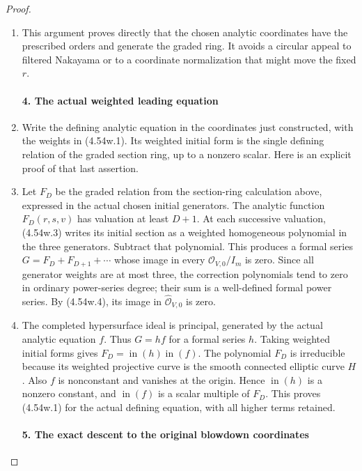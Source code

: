 \begin{proof}
\begin{enumerate}[label={$\langle1\rangle$\arabic*.},leftmargin=*]
\item This argument proves directly that the chosen analytic
coordinates have the prescribed orders and generate the
graded ring. It avoids a circular appeal to filtered
Nakayama or to a coordinate normalization that might move
the fixed \(r\).

\paragraph{4. The actual weighted leading equation}

\item Write the defining analytic equation in the coordinates just
constructed, with the weights in (4.54w.1). Its weighted initial
form is the single defining relation of the graded section
ring, up to a nonzero scalar. Here is an explicit proof of that
last assertion.

\item Let \(F_D\) be the graded relation from the section-ring calculation above, expressed
in the actual chosen initial generators. The analytic function
\(F_D(r,s,v)\) has valuation at least \(D+1\).
At each successive valuation, (4.54w.3) writes its initial
section as a weighted homogeneous polynomial in the three
generators. Subtract that polynomial. This produces a formal
series \(G=F_D+F_{D+1}+\cdots\) whose image in every
\(\mathcal O_{V,0}/I_m\) is zero. Since all generator
weights are at most three, the correction polynomials tend
to zero in ordinary power-series degree; their sum is a
well-defined formal power series. By (4.54w.4), its image in
\(\widehat{\mathcal O}_{V,0}\) is zero.

\item The completed hypersurface ideal is principal, generated by
the actual analytic equation \(f\). Thus \(G=h f\) for
a formal series \(h\). Taking weighted initial forms gives
\(F_D=\operatorname{in}(h)\operatorname{in}(f)\).
The polynomial \(F_D\) is irreducible because its weighted
projective curve is the smooth connected elliptic curve
\(H\). Also \(f\) is nonconstant and vanishes at the
origin. Hence \(\operatorname{in}(h)\) is a nonzero
constant, and \(\operatorname{in}(f)\) is a scalar multiple
of \(F_D\). This proves (4.54w.1) for the actual defining
equation, with all higher terms retained.

\paragraph{5. The exact descent to the original blowdown coordinates}


\end{enumerate}
\end{proof}
